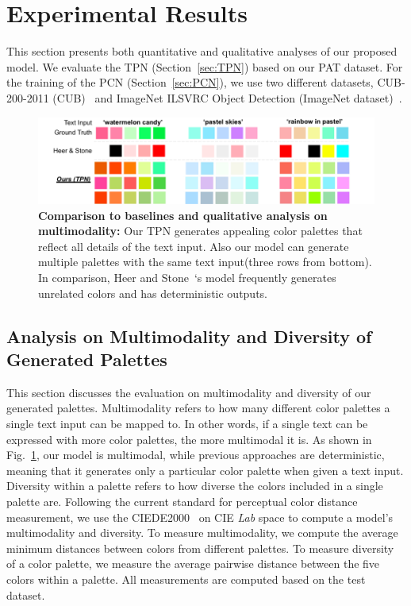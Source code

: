 \documentclass[runningheads]{llncs}
\begin{document}
\section{Experimental Results}
 
This section presents both quantitative and qualitative analyses of our proposed model. We evaluate the TPN (Section~\ref{sec:TPN}) based on our PAT dataset. For the training of the PCN (Section~\ref{sec:PCN}), we use two different datasets, CUB-200-2011 (CUB)~\cite{WahCUB_200_2011} and ImageNet ILSVRC Object Detection (ImageNet dataset)~\cite{russakovsky2015imagenet}. 

\begin{figure}[t]
\centering
\includegraphics[width=\textwidth]{./palette1.png}
\caption{\textbf{Comparison to baselines and qualitative analysis on multimodality:} Our TPN generates appealing color palettes that reflect all details of the text input. Also our model can generate multiple palettes with the same text input(three rows from bottom). In comparison, Heer and Stone~\cite{heer2012color}`s model frequently generates unrelated colors and has deterministic outputs.}\label{fig:multimodal}
\end{figure}

\subsection{Analysis on Multimodality and Diversity of Generated Palettes}
This section discusses the evaluation on multimodality and diversity of our generated palettes. Multimodality refers to how many different color palettes a single text input can be mapped to. In other words, if a single text can be expressed with more color palettes, the more multimodal it is. As shown in Fig.~\ref{fig:multimodal}, our model is multimodal, while previous approaches are deterministic, meaning that it generates only a particular color palette when given a text input. 
Diversity within a palette refers to how diverse the colors included in a single palette are. Following the current standard for perceptual color distance measurement, we use the CIEDE2000~\cite{sharma2005ciede2000} on CIE \emph{Lab} space to compute a model's multimodality and diversity. To measure multimodality, we compute the average minimum distances between colors from different palettes. To measure diversity of a color palette, we measure the average pairwise distance between the five colors within a palette. All measurements are computed based on the test dataset. 
\end{document}
